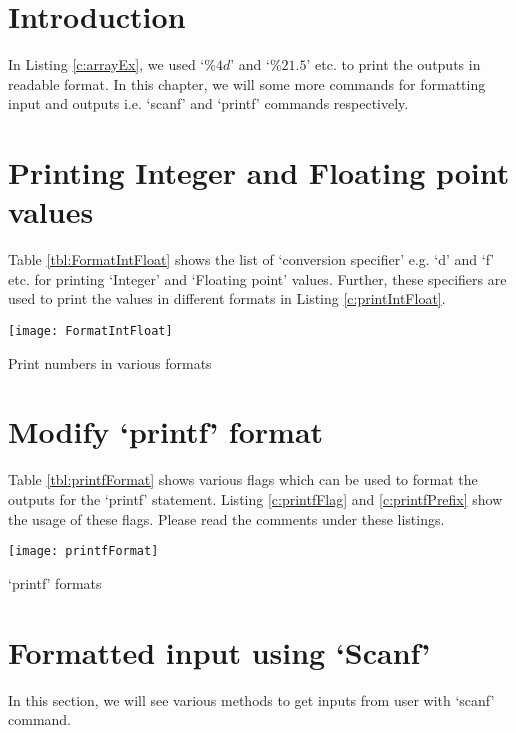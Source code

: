 \section{Introduction}
In Listing \ref{c:arrayEx}, we used `$\%4d$' and `$\%21.5$' etc. to print the outputs in readable format. In this chapter, we will some more commands for formatting input and outputs i.e. `scanf' and `printf' commands respectively. 

\section{Printing Integer and Floating point values}
Table \ref{tbl:FormatIntFloat} shows the list of `conversion specifier' e.g. `d' and `f' etc. for printing `Integer' and `Floating point' values. Further, these specifiers are used to print the values in different formats in Listing \ref{c:printIntFloat}. 
\begin{table}[!h]
	\centering
	\texttt{[image: FormatIntFloat]}
	\caption{Print numbers in various formats}
	\label{tbl:FormatIntFloat}
\end{table}




\section{Modify `printf' format}
Table \ref{tbl:printfFormat} shows various flags which can be used to format the outputs for the `printf' statement. Listing \ref{c:printfFlag} and \ref{c:printfPrefix} show the usage of these flags. Please read the comments under these listings. 
\begin{table}[!h]
	\centering
	\texttt{[image: printfFormat]}
	\caption{`printf' formats}
	\label{tbl:printfFormat}
\end{table}





\section{Formatted input using `Scanf'}
In this section, we will see various methods to get inputs from user with `scanf' command. 

